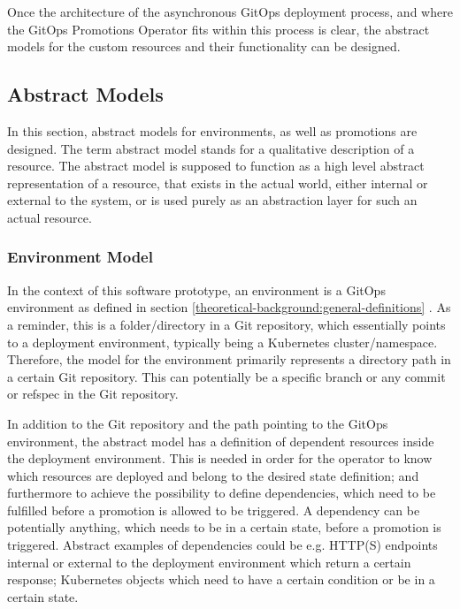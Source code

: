 Once the architecture of the asynchronous GitOps deployment process,
and where the GitOps Promotions Operator fits within this process is clear,
the abstract models for the custom resources and their functionality can be designed.






\subsection{Abstract Models}

In this section,
abstract models for environments, as well as promotions are designed.
The term abstract model stands for a qualitative description of a resource.
The abstract model is supposed to function as a high level abstract representation of a resource,
that exists in the actual world, either internal or external to the system,
or is used purely as an abstraction layer for such an actual resource.

\subsubsection*{Environment Model}

In the context of this software prototype,
an environment is a GitOps environment as defined in section
\ref{theoretical-background:general-definitions} .
As a reminder, this is a folder/directory in a Git repository,
which essentially points to a deployment environment, typically being a Kubernetes cluster/namespace.
Therefore, the model for the environment primarily represents a directory path in a certain Git repository.
This can potentially be a specific branch or any commit or refspec in the Git repository.

In addition to the Git repository and the path pointing to the GitOps environment,
the abstract model has a definition of dependent resources inside the deployment environment.
This is needed in order for the operator to know which resources are deployed and belong to the desired state definition;
and furthermore to achieve the possibility to define dependencies,
which need to be fulfilled before a promotion is allowed to be triggered.
A dependency can be potentially anything, which needs to be in a certain state, before a promotion is triggered.
Abstract examples of dependencies could be e.g.
HTTP(S) endpoints internal or external to the deployment environment which return a certain response;
Kubernetes objects which need to have a certain condition or be in a certain state.

